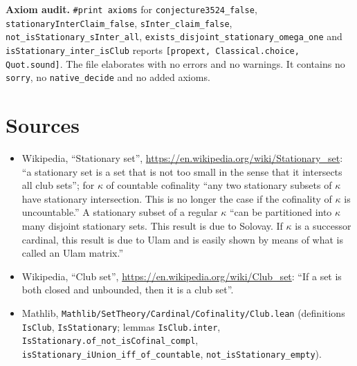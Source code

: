 \documentclass[11pt]{article}
\theoremstyle{definition}
\theoremstyle{remark}
\begin{document}
\textbf{Axiom audit.} \texttt{\#print axioms} for \texttt{conjecture3524\_false},
\texttt{stationaryInterClaim\_false}, \texttt{sInter\_claim\_false},
\texttt{not\_isStationary\_sInter\_all}, \texttt{exists\_disjoint\_stationary\_omega\_one} and
\texttt{isStationary\_inter\_isClub} reports \texttt{[propext, Classical.choice, Quot.sound]}.
The file elaborates with no errors and no warnings. It contains no \texttt{sorry}, no
\texttt{native\_decide} and no added axioms.

\section*{Sources}
\begin{itemize}
\item Wikipedia, ``Stationary set'',
  \url{https://en.wikipedia.org/wiki/Stationary_set}: ``a stationary set is a set that is not too
  small in the sense that it intersects all club sets''; for $\kappa$ of countable cofinality
  ``any two stationary subsets of $\kappa$ have stationary intersection. This is no longer the
  case if the cofinality of $\kappa$ is uncountable.'' A stationary subset of a regular $\kappa$
  ``can be partitioned into $\kappa$ many disjoint stationary sets. This result is due to
  Solovay. If $\kappa$ is a successor cardinal, this result is due to Ulam and is easily shown
  by means of what is called an Ulam matrix.''
\item Wikipedia, ``Club set'', \url{https://en.wikipedia.org/wiki/Club_set}: ``If a set is both
  closed and unbounded, then it is a club set''.
\item Mathlib, \texttt{Mathlib/SetTheory/Cardinal/Cofinality/Club.lean} (definitions
  \texttt{IsClub}, \texttt{IsStationary}; lemmas \texttt{IsClub.inter},
  \texttt{IsStationary.of\_not\_isCofinal\_compl},
  \texttt{isStationary\_iUnion\_iff\_of\_countable}, \texttt{not\_isStationary\_empty}).
\end{itemize}
\end{document}
